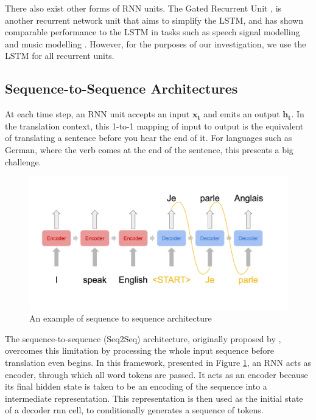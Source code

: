 There also exist other forms of RNN units. The Gated Recurrent Unit \citep{cho_properties_2014}, is another recurrent network unit that aims to simplify the LSTM, and has shown comparable performance to the LSTM in tasks such as speech signal modelling and music modelling \citep{chung_empirical_2014}.
However, for the purposes of our investigation, we use the LSTM for all recurrent units.


\subsection{Sequence-to-Sequence Architectures} %
\label{sub:sequence_to_sequence_architectures}

At each time step, an RNN unit accepts an input $\mathbf{x_t}$ and emits an output $\mathbf{h_t}$. In the translation context, this 1-to-1 mapping of input to output is the equivalent of translating a sentence before you hear the end of it. For languages such as German, where the verb comes at the end of the sentence, this presents a big challenge.

\begin{figure}[tb]
    \centering
    \includegraphics[width=\linewidth]{ModelPics/seq2seq.png}
    \caption{An example of sequence to sequence architecture}
    \label{fig:seqtoseq}
\end{figure}

The sequence-to-sequence (Seq2Seq) architecture, originally proposed by \citet{sutskever_sequence_2014}, overcomes this limitation by processing the whole input sequence before translation even begins. 
In this framework, presented in Figure \ref{fig:seqtoseq}, an RNN acts as encoder, through which all word tokens are passed. 
It acts as an encoder because its final hidden state is taken to be an encoding of the sequence into a intermediate representation. 
This representation is then used as the initial state of a decoder rnn cell, to conditionally generates a sequence of tokens.

